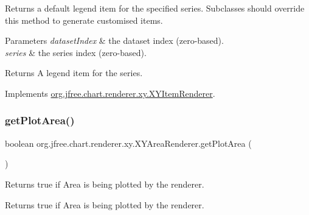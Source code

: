 Returns a default legend item for the specified series. Subclasses should override this method to generate customised items.


\begin{DoxyParams}{Parameters}
{\em dataset\+Index} & the dataset index (zero-\/based). \\
\hline
{\em series} & the series index (zero-\/based).\\
\hline
\end{DoxyParams}
\begin{DoxyReturn}{Returns}
A legend item for the series. 
\end{DoxyReturn}


Implements \mbox{\hyperlink{interfaceorg_1_1jfree_1_1chart_1_1renderer_1_1xy_1_1_x_y_item_renderer_a792c3e8c39bf57711528cd8064d2ddb5}{org.\+jfree.\+chart.\+renderer.\+xy.\+X\+Y\+Item\+Renderer}}.

\mbox{\label{classorg_1_1jfree_1_1chart_1_1renderer_1_1xy_1_1_x_y_area_renderer_a3827715712d635ea30cca032bdf620a1}} 
\subsubsection{\texorpdfstring{get\+Plot\+Area()}{getPlotArea()}}
{\footnotesize\ttfamily boolean org.\+jfree.\+chart.\+renderer.\+xy.\+X\+Y\+Area\+Renderer.\+get\+Plot\+Area (\begin{DoxyParamCaption}{ }\end{DoxyParamCaption})}

Returns true if Area is being plotted by the renderer.

\begin{DoxyReturn}{Returns}
{\ttfamily true} if Area is being plotted by the renderer. 
\end{DoxyReturn}
\mbox{\label{classorg_1_1jfree_1_1chart_1_1renderer_1_1xy_1_1_x_y_area_renderer_a999cf1505c4e98d85655f7d6fbe05461}} 
